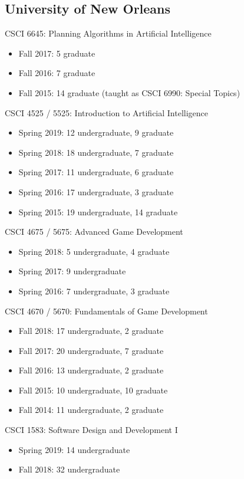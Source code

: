 \documentclass{cv}
\begin{document}
\subsection*{University of New Orleans}

CSCI 6645: Planning Algorithms in Artificial Intelligence
\begin{itemize}
	\item Fall 2017: 5 graduate
	\item Fall 2016: 7 graduate
	\item Fall 2015: 14 graduate (taught as CSCI 6990: Special Topics)
\end{itemize}
CSCI 4525 / 5525: Introduction to Artificial Intelligence
\begin{itemize}
	\item Spring 2019: 12 undergraduate, 9 graduate
	\item Spring 2018: 18 undergraduate, 7 graduate
	\item Spring 2017: 11 undergraduate, 6 graduate
	\item Spring 2016: 17 undergraduate, 3 graduate	
	\item Spring 2015: 19 undergraduate, 14 graduate
\end{itemize}
CSCI 4675 / 5675: Advanced Game Development
\begin{itemize}
	\item Spring 2018: 5 undergraduate, 4 graduate 
	\item Spring 2017: 9 undergraduate
	\item Spring 2016: 7 undergraduate, 3 graduate
\end{itemize}
CSCI 4670 / 5670: Fundamentals of Game Development
\begin{itemize}
	\item Fall 2018: 17 undergraduate, 2 graduate
	\item Fall 2017: 20 undergraduate, 7 graduate
	\item Fall 2016: 13 undergraduate, 2 graduate	
	\item Fall 2015: 10 undergraduate, 10 graduate
	\item Fall 2014: 11 undergraduate, 2 graduate
\end{itemize}
CSCI 1583: Software Design and Development I
\begin{itemize}
	\item Spring 2019: 14 undergraduate
	\item Fall 2018: 32 undergraduate
\end{itemize}
\end{document}
